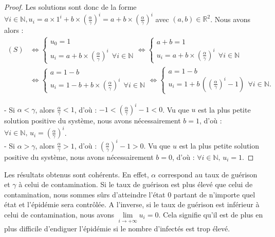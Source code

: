 \documentclass[12pt,a4paper]{report}
\theoremstyle{remark}
\begin{document}
\begin{proof}
Les solutions sont donc de la forme $\forall i \in \mathbb {N}, u_i = a \times 1^i + b \times (\frac{\alpha}{\gamma})^i = a+b\times (\frac{\alpha}{\gamma})^i$ avec $(a,b) \in \mathbb{R}^2$. Nous avons alors :
\\
\begin{align*}
(S) &\iff \left\{
\begin{array}{ll}
        u_0=1\\
        u_i=a+b\times \left(\frac{\alpha}{\gamma}\right)^i  \ \ \forall i \in \mathbb{N}
    \end{array}
\right.
\iff \left\{
\begin{array}{ll}
        a+b=1\\
        u_i=a+b\times \left(\frac{\alpha}{\gamma}\right)^i \ \ \forall i \in \mathbb{N}
    \end{array}
\right. \\
&\iff \left\{
\begin{array}{ll}
        a=1-b\\
        u_i=1-b+b\times \left(\frac{\alpha}{\gamma}\right)^i \ \ \forall i \in \mathbb{N}
    \end{array}
\right.
\iff \left\{
\begin{array}{ll}
        a=1-b\\
        u_i=1+b \, \left(\left(\frac{\alpha}{\gamma}\right)^i - 1\right)\ \ \forall i \in \mathbb{N}.
    \end{array}
\right.
\end{align*}

- Si $\alpha < \gamma$, alors $\frac{\alpha}{\gamma} < 1$, d'où : $-1 < \left(\frac{\alpha}{\gamma}\right)^i - 1 < 0$. Vu que $u$ est la plus petite solution positive du système, nous avons nécessairement $b = 1$, d'où : $\forall i \in \mathbb{N}, \, u_i = \left(\frac{\alpha}{\gamma}\right)^i$.\\

- Si $\alpha > \gamma$, alors $\frac{\alpha}{\gamma} > 1$, d'où : $\left(\frac{\alpha}{\gamma}\right)^i - 1 > 0$. Vu que $u$ est la plus petite solution positive du système, nous avons nécessairement $b = 0$, d'où : $\forall i \in \mathbb{N}, \, u_i =1$.
\end{proof}

Les résultats obtenus sont cohérents. En effet, $\alpha$ correspond au taux de guérison et $\gamma$ à celui de contamination. Si le taux de guérison est plus élevé que celui de contamination, nous sommes sûrs d'atteindre l'état $0$ partant de n'importe quel état et l'épidémie sera contrôlée. A l'inverse, si le taux de guérison est inférieur à celui de contamination, nous avons $\lim\limits_{i \to +\infty} u_i = 0$. Cela signifie qu'il est de plus en plus difficile d'endiguer l'épidémie si le nombre d'infectés est trop élevé.
\\
\end{document}
